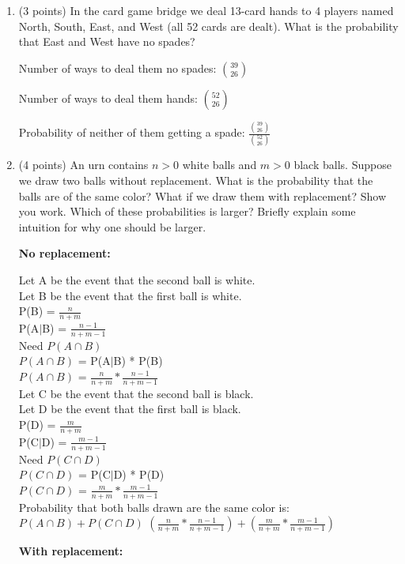 \documentclass[11pt]{article}
\begin{document}
\begin{enumerate}

\item (3 points) In the card game bridge we deal 13-card hands to 4 players
named North, South, East, and West (all 52 cards are dealt).  What is the
probability that East and West have no spades?

Number of ways to deal them no spades: $\binom{39}{26}$

Number of ways to deal them hands: $\binom{52}{26}$

Probability of neither of them getting a spade: 
$\frac{\binom{39}{26}}{\binom{52}{26}}$

\item (4 points) An urn contains $n>0$ white balls and $m>0$ black balls.
Suppose we draw two balls without replacement.  What is the probability that
the balls are of the same color?  What if we draw them with replacement?  Show
you work.  Which of these probabilities is larger?  Briefly explain some
intuition for why one should be larger.

{\bf No replacement:}

	Let A be the event that the second ball is white. \\
	Let B be the event that the first ball is white. \\
	P(B) = $\frac{n}{n+m}$ \\
	P(A$|$B) = $\frac{n-1}{n+m-1}$ \\
	Need $P(A \cap B)$ \\
	$P(A \cap B)$ = P(A$|$B) * P(B) \\
	$P(A \cap B)$ = $\frac{n}{n+m} * \frac{n-1}{n+m-1}$ \\
	Let C be the event that the second ball is black. \\
	Let D be the event that the first ball is black. \\
	P(D) = $\frac{m}{n+m}$ \\
	P(C$|$D) = $\frac{m-1}{n+m-1}$ \\
	Need $P(C \cap D)$ \\
	$P(C \cap D)$ = P(C$|$D) * P(D) \\
	$P(C \cap D)$ = $\frac{m}{n+m} * \frac{m-1}{n+m-1}$ \\
	Probability that both balls drawn are the same color is: \\
	$P(A \cap B) + P(C \cap D)$
	$(\frac{n}{n+m} * \frac{n-1}{n+m-1}) + 
	(\frac{m}{n+m} * \frac{m-1}{n+m-1})$

{\bf With replacement:}


\end{enumerate}
\end{document}
